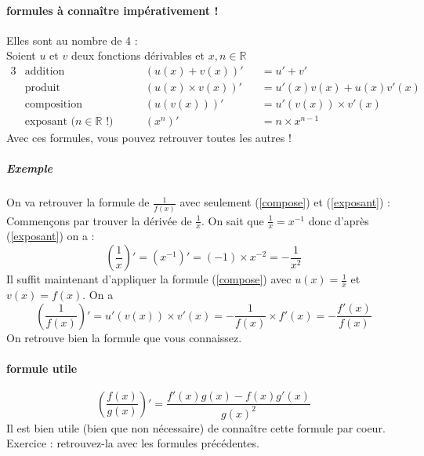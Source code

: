 \documentclass[11pt]{article}
\newcommand{\R}{\mathbb R}
\newcommand{\de}[1]{\left(#1\right)'}
\begin{document}
        \paragraph{formules à connaître impérativement !}
        Elles sont au nombre de 4 : \\Soient $u$ et $v$ deux fonctions dérivables et $x,n \in  \R $
        \begin{alignat}{3}
            &\text{addition} &\qquad& (u(x) + v(x))'&& = u'+v' \label{addition} \\
            &\text{produit} && (u(x) \times v(x))'&& = u'(x)v(x) + u(x)v'(x) \label{produit}\\
            &\text{composition} && (u(v(x)))'&& = u'(v(x)) \times v'(x) \label{compose}\\
            &\text{exposant ($n\in \R$ !)} && (x^n)'&& = n \times x^{n-1} \label{exposant}
        \end{alignat}
        Avec ces formules, vous pouvez retrouver toutes les autres !
        \subparagraph{Exemple} On va retrouver la formule de $\frac{1}{f(x)}$ avec seulement (\ref{compose}) et (\ref{exposant}) :\\
            Commençons par trouver la dérivée de $\frac{1}{x}$.
            On sait que $\frac{1}{x}=x^{-1}$ donc d'après (\ref{exposant}) on a :
                \begin{equation*}
                    \de{\frac{1}{x}}=\de{x^{-1}}=(-1)\times x^{-2} = -\frac{1}{x^2}
                \end{equation*}
            Il suffit maintenant d'appliquer la formule (\ref{compose}) avec $u(x)=\frac{1}{x}$ et $v(x)=f(x)$. On a 
                \begin{equation*}
                    \de{\frac{1}{f(x)}}=u'(v(x))\times v'(x)=-\frac{1}{f(x)}\times f'(x)=-\frac{f'(x)}{f(x)}
                \end{equation*}
            On retrouve bien la formule que vous connaissez.
        \paragraph{formule utile}
        \begin{equation*}
            (\frac{f(x)}{g(x)})' = \frac{f'(x)g(x) - f(x)g'(x)}{g(x)^2}
        \end{equation*}
        Il est bien utile (bien que non nécessaire) de connaître cette formule par coeur.\\
        Exercice : retrouvez-la avec les formules précédentes.
\end{document}
